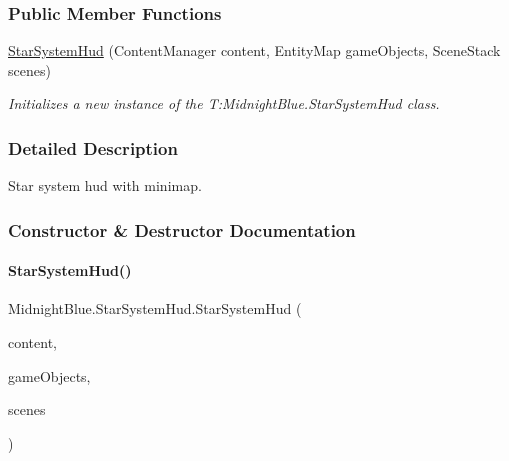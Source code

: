 \subsubsection*{Public Member Functions}
\begin{DoxyCompactItemize}
\item 
\hyperlink{class_midnight_blue_1_1_star_system_hud_acfe0b74ff1b0013956511de5ab3d38b3}{Star\+System\+Hud} (Content\+Manager content, Entity\+Map game\+Objects, Scene\+Stack scenes)
\begin{DoxyCompactList}\small\item\em Initializes a new instance of the T\+:\+Midnight\+Blue.\+Star\+System\+Hud class. \end{DoxyCompactList}\end{DoxyCompactItemize}


\subsubsection{Detailed Description}
Star system hud with minimap. 



\subsubsection{Constructor \& Destructor Documentation}
\hypertarget{class_midnight_blue_1_1_star_system_hud_acfe0b74ff1b0013956511de5ab3d38b3}{}\label{class_midnight_blue_1_1_star_system_hud_acfe0b74ff1b0013956511de5ab3d38b3} 
\paragraph{\texorpdfstring{Star\+System\+Hud()}{StarSystemHud()}}
{\footnotesize\ttfamily Midnight\+Blue.\+Star\+System\+Hud.\+Star\+System\+Hud (\begin{DoxyParamCaption}\item[{Content\+Manager}]{content,  }\item[{Entity\+Map}]{game\+Objects,  }\item[{Scene\+Stack}]{scenes }\end{DoxyParamCaption})\hspace{0.3cm}{\ttfamily [inline]}}



